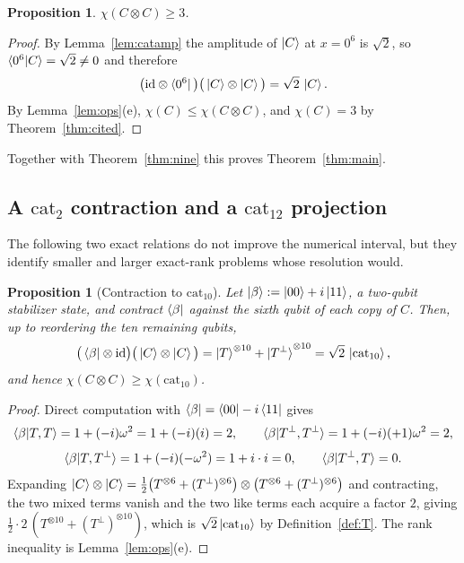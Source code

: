 \documentclass[11pt]{article}
\theoremstyle{plain}
\newtheorem{proposition}[theorem]{Proposition}
\theoremstyle{definition}
\newcommand{\cat}{\mathrm{cat}}
\begin{document}
\begin{proposition}\label{prop:lower3}
$\chi(C\otimes C)\ge3$.
\end{proposition}

\begin{proof}
By Lemma~\ref{lem:catamp} the amplitude of $\ket C$ at $x=0^6$ is $\sqrt2$, so
$\braket{0^6|C}=\sqrt2\ne0$ and therefore
\begin{equation}\label{eq:contract0}
\big(\mathrm{id}\otimes\bra{0^6}\big)\big(\ket C\otimes\ket C\big)=\sqrt2\,\ket C .
\end{equation}
By Lemma~\ref{lem:ops}(e), $\chi(C)\le\chi(C\otimes C)$, and $\chi(C)=3$ by
Theorem~\ref{thm:cited}.
\end{proof}

Together with Theorem~\ref{thm:nine} this proves Theorem~\ref{thm:main}.

\subsection{A $\cat_2$ contraction and a $\cat_{12}$ projection}

The following two exact relations do not improve the numerical interval, but they
identify smaller and larger exact-rank problems whose resolution would.

\begin{proposition}[Contraction to $\cat_{10}$]\label{prop:cat10}
Let $\ket\beta:=\ket{00}+i\ket{11}$, a two-qubit stabilizer state, and contract
$\bra\beta$ against the sixth qubit of each copy of $C$. Then, up to reordering the ten
remaining qubits,
\begin{equation}\label{eq:cat10}
\big(\bra\beta\otimes\mathrm{id}\big)\big(\ket C\otimes\ket C\big)
=\ket T^{\otimes10}+\ket{T^\perp}^{\otimes10}=\sqrt2\,\ket{\cat_{10}} ,
\end{equation}
and hence $\chi(C\otimes C)\ge\chi(\cat_{10})$.
\end{proposition}

\begin{proof}
Direct computation with $\bra\beta=\bra{00}-i\bra{11}$ gives
\[
\braket{\beta|T,T}=1+(-i)\omega^2=1+(-i)(i)=2,\qquad
\braket{\beta|T^\perp,T^\perp}=1+(-i)(+1)\omega^2=2,
\]
\[
\braket{\beta|T,T^\perp}=1+(-i)(-\omega^2)=1+i\cdot i=0,\qquad
\braket{\beta|T^\perp,T}=0 .
\]
Expanding $\ket C\otimes\ket C=\frac12\big(T^{\otimes6}+ (T^\perp)^{\otimes6}\big)
\otimes\big(T^{\otimes6}+(T^\perp)^{\otimes6}\big)$ and contracting, the two mixed
terms vanish and the two like terms each acquire a factor $2$, giving
$\frac12\cdot2\,(T^{\otimes10}+(T^\perp)^{\otimes10})$, which is
$\sqrt2\ket{\cat_{10}}$ by Definition~\ref{def:T}. The rank inequality is
Lemma~\ref{lem:ops}(e).
\end{proof}
\end{document}
